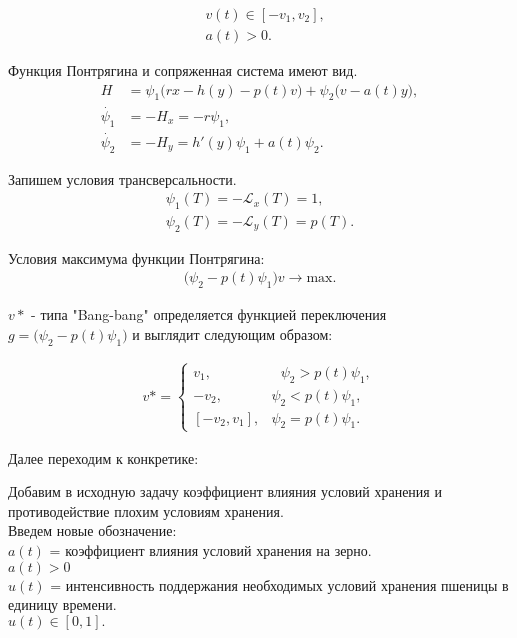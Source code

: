 {\begin{align*}
    & v(t) \in [-v_{1}, v_{2}], \\
    & a(t) > 0.
\end{align*}

Функция Понтрягина и сопряженная система имеют вид. 
\begin{align}
    {H} & = \psi_{1} \big( r x- h(y) - p(t) v \big) + \psi_{2} \big( v - a(t)y \big),\\
    \Dot{\psi_{1}} & = -H_x = -r \psi_{1},\\
    \Dot{\psi_{2}} & = -H_y = h'(y) \psi_{1} +  a(t) \psi_{2}.
\end{align} 

Запишем  условия трансверсальности.
\begin{align}
    {\psi_{1}(T)} = \mathcal{- L}_x(T)= 1,\\
    {\psi_{2}(T)} = \mathcal {- L}_y(T)= p(T).
\end{align} 


Условия максимума функции Понтрягина:\\
\begin{align}
     \big (\psi_{2} - p(t)\psi_{1}\big )v \to \mathrm{max}.
\end{align}


${v*}$ - типа "Bang-bang" определяется функцией переключения\\
$g = \big (\psi_{2} - p(t)\psi_{1} \big)$ и выглядит следующим образом:

\begin{align}
v* = 
 \begin{cases}
   v_{1}, &\text{ $\psi_{2} > p(t)\psi_{1}$},\\
   -v_{2}, &\text{$\psi_{2} < p(t)\psi_{1}$},\\
   [-v_{2},v_{1}], &\text{$\psi_{2} = p(t)\psi_{1}$}.
 \end{cases}
\end{align}

Далее переходим к конкретике: 

Добавим в исходную задачу коэффициент влияния условий хранения и противодействие плохим условиям хранения.\\

Введем новые обозначение:\\
${a(t)}$ = коэффициент влияния условий хранения на зерно.\\
$a(t) > 0$\\
${u(t)}$ = интенсивность поддержания необходимых условий хранения пшеницы в единицу времени.\\
$u(t) \in [0,1]. $\\

}
